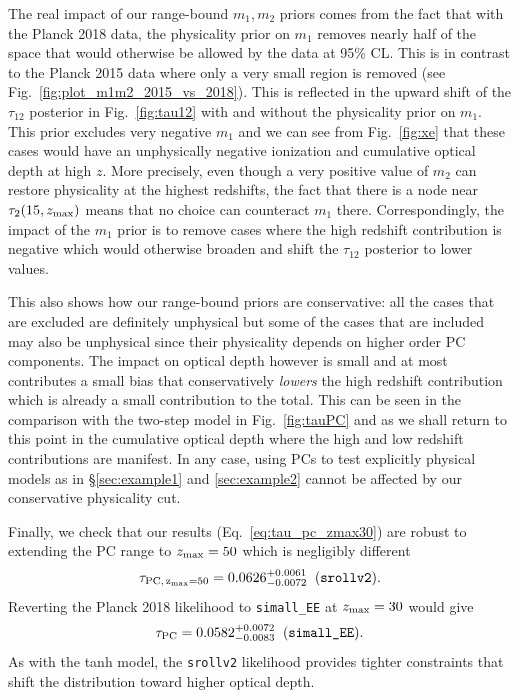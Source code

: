 \documentclass[prd,twocolumn,amsmath,amssymb,floatfix,superscriptaddress,nofootinbib]{revtex4-1}
\newcommand{\zmax}{z_{\rm max}}
\newcommand{\beq}{\begin{equation}}
\newcommand{\eeq}{\end{equation}}
\begin{document}
{The real impact of our range-bound $m_1,m_2$ priors comes from the fact that with the Planck 2018 data, the physicality prior on $m_1$
removes nearly half of the space that would otherwise be allowed by the
data at 95\% CL.  This is in contrast to the Planck 2015 data where only a very small region is removed (see Fig.~\ref{fig:plot_m1m2_2015_vs_2018}).  
This is reflected in the upward shift of the $\tau_{12}$ posterior in Fig.~\ref{fig:tau12} with and without the physicality prior on $m_1$.   This prior excludes very negative $m_1$ and we can see from Fig.~\ref{fig:xe} that these cases would have an unphysically negative ionization and cumulative optical depth at high $z$.  More precisely, even though a very positive value 
of $m_2$ can restore physicality at the highest redshifts, the fact that there is a node near $\tau_2(15,z_{\rm max})$ means that no choice can counteract $m_1$ there.  
Correspondingly, the impact of the $m_1$ prior is to remove
cases where the high redshift contribution is negative which would otherwise broaden and shift the $\tau_{12}$ posterior to lower values.

This also shows how our range-bound priors 
are conservative: all the cases that are excluded are definitely unphysical but some of the cases that are included
may also be unphysical since their physicality depends on higher order PC components.  The impact on optical depth  however is small and at most contributes a small bias that conservatively {\it lowers} the high redshift contribution which is already a small contribution to the total.  
This can be seen  in the comparison with the two-step model 
in Fig.~\ref{fig:tauPC} and as we shall return to this point in the cumulative optical depth where the high and low redshift contributions are manifest.
In any case, using PCs to 
test explicitly physical models as in \S \ref{sec:example1} and
\ref{sec:example2} cannot be affected by our conservative physicality
cut.

Finally, we check that our results (Eq.~\ref{eq:tau_pc_zmax30}) are robust to
 extending the PC
range to
$z_{\rm max}=50$ which is negligibly different
\beq
\tau_{\rm PC,\, \zmax=50} = 0.0626^{+0.0061}_{-0.0072}\;\; (\texttt{srollv2}).
\eeq
Reverting the Planck 2018 likelihood to \texttt{simall\_EE} at $z_{\rm max}=30$ would give
\beq
\tau_{\rm PC} = 0.0582 ^{+0.0072}_{-0.0083}\;\; (\texttt{simall\_EE}).
\eeq
As with the tanh model, the \texttt{srollv2} likelihood provides tighter constraints that shift the distribution toward higher optical depth.










}
\end{document}
